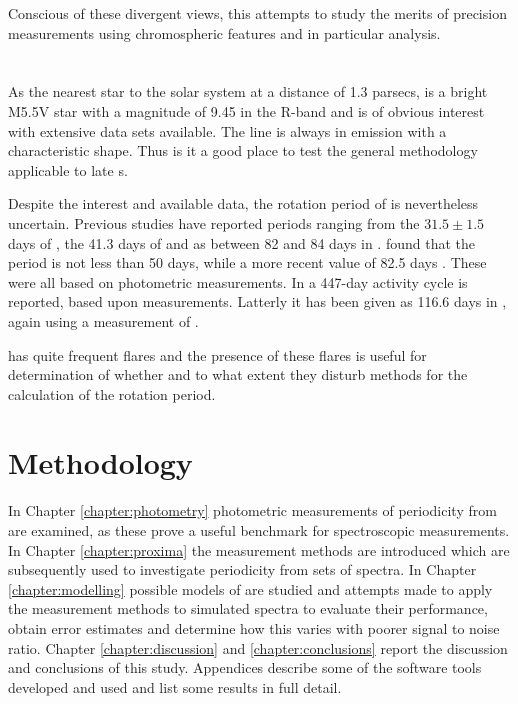 Conscious of these divergent views, this {\paperorthesis} attempts to study the merits of precision measurements using
chromospheric features and in particular {\ha} analysis.

\section{\prox}
\protect\label{section:introprox}

As the nearest star to the solar system at a distance of 1.3 parsecs, {\prox} is a bright M5.5V star with a magnitude of
9.45 in the R-band and is of obvious interest with extensive data sets available. The {\ha} line is always in emission
with a characteristic shape. Thus is it a good place to test the general methodology applicable to late \rdwarf s.

Despite the interest and available data, the rotation period of {\prox} is nevertheless uncertain.  Previous studies
have reported periods ranging from the $ 31.5 \pm 1.5 $ days of \citet{guinan96}, the 41.3 days of \citet{benedict93} and
as between 82 and 84 days in \citealt{benedict92,benedict98}.  \citet{kurster99} found that the period is not less than
50 days, while a more recent value of 82.5 days \citep{kiraga07}. These were all based on photometric measurements.
In \citet{cincunegui07} a 447-day activity cycle is reported, based upon {\ha} measurements. Latterly it has been given
as 116.6 days in \citet[Table 3]{suarezmascareno15}, again using a measurement of {\ha}.

{\prox} has quite frequent flares and the presence of these flares is useful for determination of whether and to what
extent they disturb methods for the calculation of the rotation period.

\section{Methodology}
\protect\label{section:methodology}

In Chapter \ref{chapter:photometry} photometric measurements of periodicity from {\prox} are examined, as these prove a
useful benchmark for spectroscopic measurements. In Chapter \ref{chapter:proxima} the measurement methods are introduced
which are subsequently used to investigate periodicity from sets of spectra. In Chapter \ref{chapter:modelling} possible
models of {\prox} are studied and attempts made to apply the measurement methods to simulated spectra to evaluate their
performance, obtain error estimates and determine how this varies with poorer signal to noise ratio.  Chapter
\ref{chapter:discussion} and \ref{chapter:conclusions} report the discussion and conclusions of this study. Appendices
describe some of the software tools developed and used and list some results in full detail.

